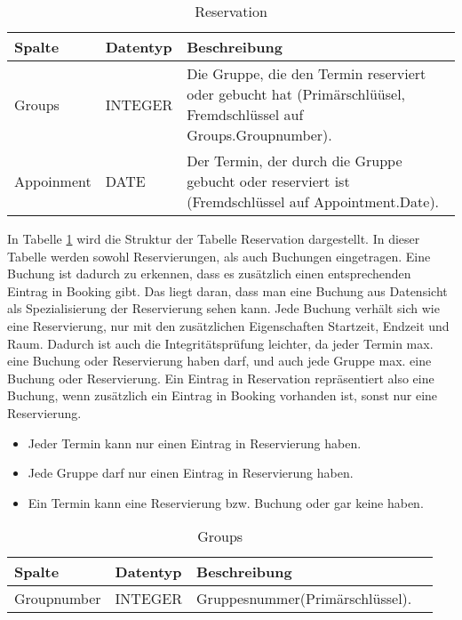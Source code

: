 \documentclass[10pt,a4paper]{article}
\begin{document}
\begin{table}[h]
\centering
	\caption{Reservation}
	\label{tab:Reservation}
    \begin{tabular}{| l | l | l |}
    \hline
    \rowcolor{lightgray} Spalte & Datentyp & Beschreibung  \\ \hline
    Groups & INTEGER & Die Gruppe, die den Termin reserviert oder gebucht hat (Primärschlüüsel, Fremdschlüssel auf Groups.Groupnumber).  \\ \hline
    Appoinment & DATE & Der Termin, der durch die Gruppe gebucht oder reserviert ist (Fremdschlüssel auf Appointment.Date). \\ \hline
    \end{tabular}
\end{table}
In Tabelle \ref{tab:Reservation} wird die Struktur der Tabelle Reservation  dargestellt.  In dieser Tabelle werden sowohl Reservierungen, als auch Buchungen eingetragen. Eine Buchung ist dadurch zu erkennen, dass es zusätzlich einen entsprechenden Eintrag in Booking gibt. Das liegt daran, dass man eine Buchung aus Datensicht als Spezialisierung der Reservierung sehen kann. Jede Buchung verhält sich wie eine Reservierung, nur mit den zusätzlichen Eigenschaften Startzeit, Endzeit und Raum. Dadurch ist auch die Integritätsprüfung leichter, da jeder Termin max. eine Buchung oder Reservierung haben darf, und auch jede Gruppe max. eine Buchung oder Reservierung. Ein Eintrag in Reservation repräsentiert also eine Buchung, wenn zusätzlich ein Eintrag in Booking vorhanden ist, sonst nur eine Reservierung.

\begin{itemize} 
	\item Jeder Termin kann nur einen Eintrag in Reservierung haben.
	\item Jede Gruppe darf nur einen Eintrag in Reservierung haben.
	\item Ein Termin kann eine Reservierung bzw. Buchung oder gar keine haben.
\end{itemize}

\begin{table}[h]
\centering
\caption{Groups}
    \label{tab:Groups}    
    \begin{tabular}{| l | l | l | l |}
    \hline
    \rowcolor{lightgray} Spalte & Datentyp & Beschreibung  \\ \hline
    Groupnumber & INTEGER & Gruppesnummer(Primärschlüssel).  \\ \hline
   \end{tabular}
\end{table}
\end{document}
